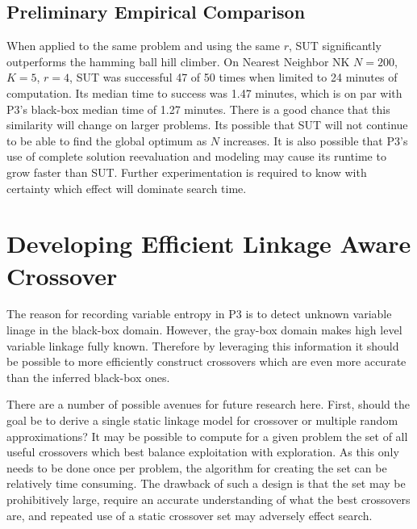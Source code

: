 \subsection{Preliminary Empirical Comparison}
When applied to the same problem and using the same $r$, SUT significantly outperforms the hamming ball hill climber.
On Nearest Neighbor NK $N=200$, $K=5$, $r=4$, SUT was successful 47 of 50 times when limited to 24 minutes of computation.
Its median time to success was 1.47 minutes, which is on par with P3's black-box median time of 1.27 minutes.
There is a good chance that this similarity will change on larger problems. Its possible that SUT will not
continue to be able to find the global optimum as $N$ increases. It is also possible that P3's use of complete solution
reevaluation and modeling may cause its runtime to grow faster than SUT. Further experimentation is required to know
with certainty which effect will dominate search time.

\section{Developing Efficient Linkage Aware Crossover}
The reason for recording variable entropy in P3 is to detect unknown variable linage in the black-box domain. However,
the gray-box domain makes high level variable linkage fully known. Therefore by leveraging this information it should
be possible to more efficiently construct crossovers which are even more accurate than the inferred black-box ones.

There are a number of possible avenues for future research here. First, should the goal be to derive a single
static linkage model for crossover or multiple random approximations? It may be possible to compute for
a given problem the set of all useful crossovers which best balance exploitation with exploration. As
this only needs to be done once per problem, the algorithm for creating the set can be relatively time consuming.
The drawback of such a design is that the set may be prohibitively large, require an accurate understanding of what
the best crossovers are, and repeated use of a static crossover set may adversely effect search.


